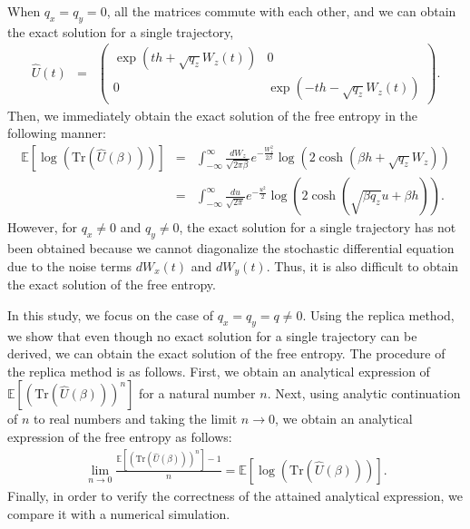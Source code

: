 \documentclass[
aps,
pre,
showpacs
]{revtex4-1}
\newcommand{\be}{\begin{eqnarray}}
\newcommand{\ee}{\end{eqnarray}}
\newcommand{\no}{\nonumber}
\newcommand{\Tr}{\mbox{Tr} }
\begin{document}
When $q_x=q_y=0$, all the matrices commute with each other, and we can obtain the exact solution for a single trajectory,
\be
\hat{U}(t)&=&
\left(\begin{array}{cc}
\exp\left(th+\sqrt{q_z}W_z(t)\right) & 0 \\
 0 & \exp\left(-t h-\sqrt{q_z}W_z(t)\right)
\end{array}\right).
\ee
Then, we immediately obtain the exact solution of the free entropy in the following manner:
\be
\mathbb{E} \left[ \log\left( \Tr \left(\hat{U}(\beta)\right) \right) \right] &=& \int_{-\infty}^{\infty} \frac{dW_z}{\sqrt{2\pi \beta}} e^{-\frac{W_z^2}{2\beta}} \log \left(2\cosh\left(\beta h+\sqrt{q_z}W_z\right) \right)
\no\\
&=& \int_{-\infty}^{\infty} \frac{du}{\sqrt{2\pi }} e^{-\frac{u^2}{2}} \log \left(2\cosh\left(\sqrt{\beta q_z}u +\beta h \right) \right). \label{exact-trivial}
\ee
However, for $q_x\neq0$ and $q_y\neq0$, the exact solution for a single trajectory has not been obtained because we cannot diagonalize the stochastic differential equation due to the noise terms $dW_{x}(t)$ and $dW_{y}(t)$.
Thus, it is also difficult to obtain the exact solution of the free entropy.


In this study, we focus on the case of $q_x=q_y=q\neq0$.
Using the replica method, we show that even though no exact solution for a single trajectory can be derived, we can obtain the exact solution of the free entropy.
The procedure of the replica method is as follows.
First, we obtain an analytical expression of $\mathbb{E} \left[ \left( \Tr \left(\hat{U}(\beta)\right) \right)^n\right]$ for a natural number $n$.
Next, using analytic continuation of $n$ to real numbers and taking the limit $n\rightarrow0$, we obtain an analytical expression of the free entropy as follows:
\be
\lim_{n\rightarrow0} \frac{ \mathbb{E} \left[ \left( \Tr \left(\hat{U}(\beta)\right) \right)^n\right]-1}{n} =\mathbb{E} \left[ \log\left( \Tr \left(\hat{U}(\beta)\right) \right) \right].
\ee
Finally, in order to verify the correctness of the attained analytical expression, we compare it with a numerical simulation.

\end{document}
